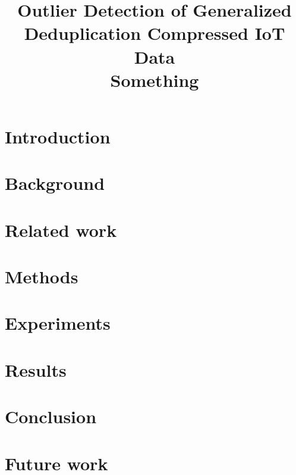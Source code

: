 \documentclass[conference]{IEEEtran}
\begin{document}
\title{Outlier Detection of Generalized Deduplication Compressed IoT Data\\
{\LARGE Something}\\
}

\author{
}

\maketitle
\thispagestyle{plain}
\pagestyle{plain}
\begin{abstract}
\end{abstract}

\begin{IEEEkeywords}
\end{IEEEkeywords}

\section{Introduction}


\section{Background}


\section{Related work}


\section{Methods}


\section{Experiments}


\section{Results}


\section{Conclusion}


\section{Future work}


\printbibliography[title={References}]
\end{document}
